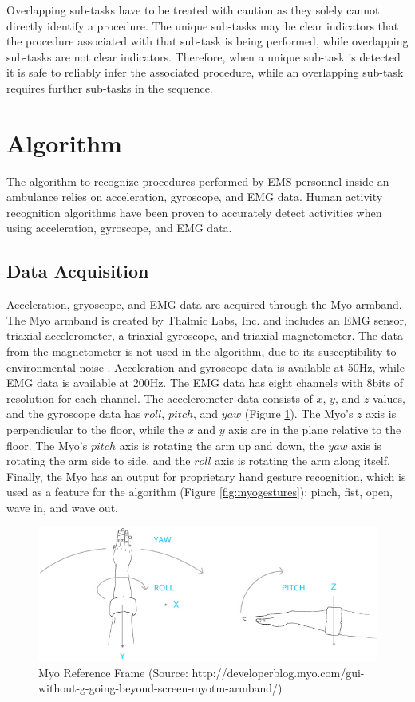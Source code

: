 Overlapping sub-tasks have to be treated with caution as they solely cannot directly identify a procedure. The unique sub-tasks may be clear indicators that the procedure associated with that sub-task is being performed, while overlapping sub-tasks are not clear indicators. Therefore, when a unique sub-task is detected it is safe to reliably infer the associated procedure, while an overlapping sub-task requires further sub-tasks in the sequence.

\section{Algorithm}
\label{sec:Approach:Algorithm}
The algorithm to recognize procedures performed by EMS personnel inside an ambulance relies on acceleration, gyroscope, and EMG data. Human activity recognition algorithms have been proven to accurately detect activities when using acceleration, gyroscope, and EMG data.

\subsection{Data Acquisition}
Acceleration, gryoscope, and EMG data are acquired through the Myo armband. The Myo armband is created by Thalmic Labs, Inc. and includes an EMG sensor, triaxial accelerometer, a triaxial gyroscope, and triaxial magnetometer. The data from the magnetometer is not used in the algorithm, due to its susceptibility to environmental noise \cite{Ahmad2013}. Acceleration and gyroscope data is available at 50Hz, while EMG data is available at 200Hz. The EMG data has eight channels with 8bits of resolution for each channel. The accelerometer data consists of $x$, $y$, and $z$ values, and the gyroscope data has $roll$, $pitch$, and $yaw$ (Figure \ref{fig:myo}). The Myo's $z$ axis is perpendicular to the floor, while the $x$ and $y$ axis are in the plane relative to the floor. The Myo's $pitch$ axis is rotating the arm up and down, the $yaw$ axis is rotating the arm side to side, and the $roll$ axis is rotating the arm along itself. Finally, the Myo has an output for proprietary hand gesture recognition, which is used as a feature for the algorithm (Figure \ref{fig:myogestures}): pinch, fist, open, wave in, and wave out.

\begin{figure}
	\centering
	\includegraphics[width=0.7\linewidth]{pictures/myo}
	\caption{Myo Reference Frame (Source: http://developerblog.myo.com/gui-without-g-going-beyond-screen-myotm-armband/)}
	\label{fig:myo}
\end{figure}

